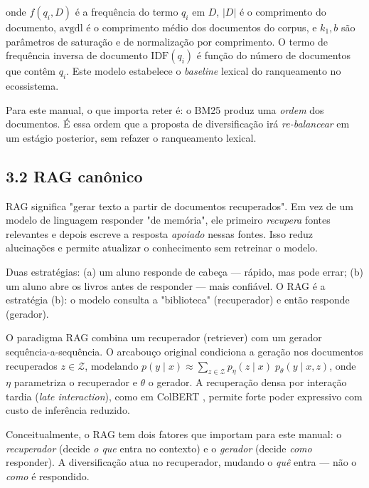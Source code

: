 onde $f(q_i,D)$ é a frequência do termo $q_i$ em $D$, $|D|$ é o comprimento do
documento, $\text{avgdl}$ é o comprimento médio dos documentos do corpus, e
$k_1,b$ são parâmetros de saturação e de normalização por comprimento. O termo de
frequência inversa de documento $\text{IDF}(q_i)$ é função do número de documentos
que contêm $q_i$. Este modelo estabelece o \emph{baseline} lexical do
ranqueamento no ecossistema.

 Para este manual, o que importa reter é: o BM25 produz uma \emph{ordem}
dos documentos. É essa ordem que a proposta de diversificação irá
\emph{re-balancear} em um estágio posterior, sem refazer o ranqueamento lexical.

\subsection*{3.2 RAG canônico}

 RAG significa "gerar texto a partir de documentos recuperados". Em vez
de um modelo de linguagem responder "de memória", ele primeiro \emph{recupera}
fontes relevantes e depois escreve a resposta \emph{apoiado} nessas fontes. Isso
reduz alucinações e permite atualizar o conhecimento sem retreinar o modelo.

\begin{intuicao}
Duas estratégias: (a) um aluno responde de cabeça --- rápido, mas pode errar; (b)
um aluno abre os livros antes de responder --- mais confiável. O RAG é a
estratégia (b): o modelo consulta a "biblioteca" (recuperador) e então responde
(gerador).
\end{intuicao}

 O paradigma RAG combina um recuperador (retriever) com um gerador
sequência-a-sequência. O arcabouço original \cite{Lewis2020RAG} condiciona a
geração nos documentos recuperados $z \in \mathcal{Z}$, modelando
$p(y \mid x) \approx \sum_{z \in \mathcal{Z}} p_\eta(z \mid x)\; p_\theta(y \mid x, z)$,
onde $\eta$ parametriza o recuperador e $\theta$ o gerador. A recuperação densa
por interação tardia (\emph{late interaction}), como em ColBERT
\cite{KhattabZaharia2020ColBERT}, permite forte poder expressivo com custo de
inferência reduzido.

 Conceitualmente, o RAG tem dois fatores que importam para este manual:
o \emph{recuperador} (decide \emph{o que} entra no contexto) e o \emph{gerador}
(decide \emph{como} responder). A diversificação atua no recuperador, mudando o
\emph{quê} entra --- não o \emph{como} é respondido.

